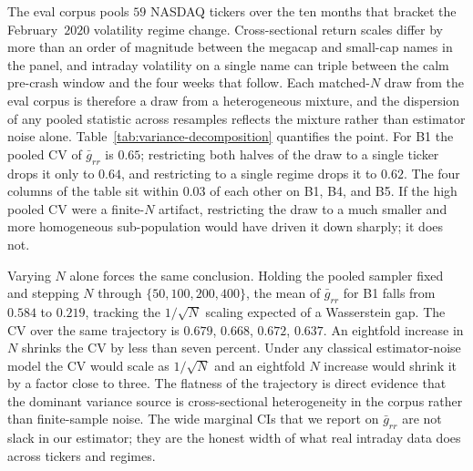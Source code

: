 
The eval corpus pools $59$ NASDAQ tickers over the ten months that bracket the February~$2020$ volatility regime change. Cross-sectional return scales differ by more than an order of magnitude between the megacap and small-cap names in the panel, and intraday volatility on a single name can triple between the calm pre-crash window and the four weeks that follow. Each matched-$N$ draw from the eval corpus is therefore a draw from a heterogeneous mixture, and the dispersion of any pooled statistic across resamples reflects the mixture rather than estimator noise alone. Table~\ref{tab:variance-decomposition} quantifies the point. For B1 the pooled CV of $\bar{g}_{rr}$ is $0.65$; restricting both halves of the draw to a single ticker drops it only to $0.64$, and restricting to a single regime drops it to $0.62$. The four columns of the table sit within $0.03$ of each other on B1, B4, and B5. If the high pooled CV were a finite-$N$ artifact, restricting the draw to a much smaller and more homogeneous sub-population would have driven it down sharply; it does not.

Varying $N$ alone forces the same conclusion. Holding the pooled sampler fixed and stepping $N$ through $\{50, 100, 200, 400\}$, the mean of $\bar{g}_{rr}$ for B1 falls from $0.584$ to $0.219$, tracking the $1/\sqrt{N}$ scaling expected of a Wasserstein gap. The CV over the same trajectory is $0.679$, $0.668$, $0.672$, $0.637$. An eightfold increase in $N$ shrinks the CV by less than seven percent. Under any classical estimator-noise model the CV would scale as $1/\sqrt{N}$ and an eightfold $N$ increase would shrink it by a factor close to three. The flatness of the trajectory is direct evidence that the dominant variance source is cross-sectional heterogeneity in the corpus rather than finite-sample noise. The wide marginal CIs that we report on $\bar{g}_{rr}$ are not slack in our estimator; they are the honest width of what real intraday data does across tickers and regimes.

